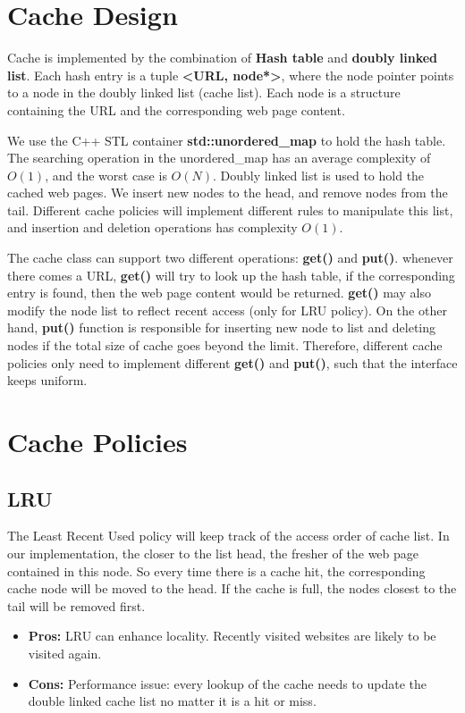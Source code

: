 \documentclass[paper=a4, fontsize=11pt]{scrartcl} %
\numberwithin{equation}{section} %
\numberwithin{figure}{section} %
\numberwithin{table}{section} %
\begin{document}
\section{Cache Design}

Cache is implemented by the combination of \textbf{Hash table} 
and \textbf{doubly linked list}. Each hash entry is 
a tuple \textbf{<URL, node*>}, where the node pointer points to a node
in the doubly linked list (cache list). Each node is a structure
containing the URL and the corresponding web page content.

\vspace{1em}

We use the C++ STL container \textbf{std::unordered\_map} to hold the 
hash table. The searching operation in the unordered\_map
has an average complexity of $O(1)$, and the worst case is $O(N)$. Doubly
linked list is used to hold the cached web pages. We insert new nodes
to the head, and remove nodes from the tail. Different cache policies will
implement different rules to manipulate this list, and insertion and
deletion operations has complexity $O(1)$.

\vspace{1em}

The cache class can support two different operations: \textbf{get()} and
\textbf{put()}. whenever there comes a URL, \textbf{get()} will try to look
up the hash table, if the corresponding entry is found, then the web page
content would be returned. 
\textbf{get()} may also modify the node list to reflect recent access
(only for LRU policy). On the other hand, \textbf{put()} function is
responsible for inserting new node to list and deleting nodes if the
total size of cache goes beyond the limit. Therefore, different cache 
policies only need to implement different \textbf{get()} and 
\textbf{put()}, 
such that the interface keeps uniform.

\section{Cache Policies}

\subsection{LRU}
The Least Recent Used policy will keep track of the access order 
of cache list. In our implementation, the closer to the list head, 
the fresher of the web page contained in this node. So every time 
there is a cache hit, the corresponding cache node will be moved to
the head. If the cache is full, the nodes closest to the tail will
be removed first.
\begin{itemize}
\item \textbf{Pros:} LRU can enhance locality. Recently visited websites
are likely to be visited again.
\item \textbf{Cons:} Performance issue: every lookup of the cache needs
to update the double linked cache list no matter it is a hit or
miss.
\end{itemize}
\end{document}
